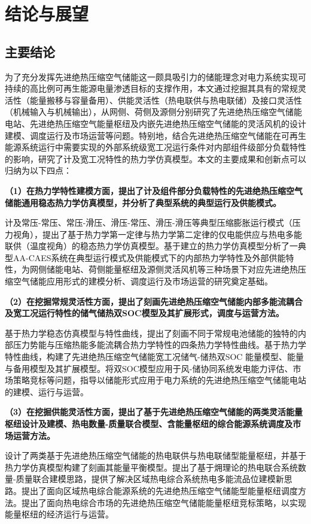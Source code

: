 \chapter{结论与展望}
\label{cha:conclusion}

\section{主要结论}
\label{sec:conclusion}
为了充分发挥先进绝热压缩空气储能这一颇具吸引力的储能理念对电力系统实现可持续的高比例可再生能源电量渗透目标的支撑作用，本文通过挖掘其具有的常规灵活性（能量搬移与容量备用）、供能灵活性（热电联供与热电联储）及接口灵活性（机械输入与机械输出），从网侧、荷侧及源侧分别研究了先进绝热压缩空气储能电站、先进绝热压缩空气能量枢纽及内嵌先进绝热压缩空气储能的灵活风机的设计建模、调度运行及市场运营等问题。特别地，结合先进绝热压缩空气储能在可再生能源系统运行中需要实现的外部系统级宽工况运行条件对内部组件级部分负载特性的影响，研究了计及宽工况特性的热力学仿真模型。本文的主要成果和创新点可以归纳为以下四点：

\textbf{（1）在热力学特性建模方面，提出了计及组件部分负载特性的先进绝热压缩空气储能通用稳态热力学仿真模型，并分析了典型系统的典型运行及供能模式。}

计及常压-常压、常压-滑压、滑压-常压、滑压-滑压等典型压缩膨胀运行模式（压力视角），提出了基于热力学第一定律与热力学第二定律的仅电能供应与热电多能联供（温度视角）的稳态热力学仿真模型。基于建立的热力学仿真模型分析了一典型AA-CAES系统在典型运行模式及供能模式下的内部热力学特性及外部供能特性，为网侧储能电站、荷侧能量枢纽及源侧灵活风机等三种场景下对应先进绝热压缩空气储能应用形式的建模分析、调度运行及市场运营的研究奠定基础。

\textbf{（2）在挖掘常规灵活性方面，提出了刻画先进绝热压缩空气储能内部多能流耦合及宽工况运行特性的储气储热双SOC模型及其扩展形式，调度与运营方法。}

基于热力学稳态仿真模型与特性曲线，提出了刻画不同于常规电池储能的独特的内部压力势能与压缩热能多能流耦合热力学特性的四条热力学特性曲线。基于热力学特性曲线，构建了先进绝热压缩空气储能宽工况储气-储热双SOC 能量模型、能量与备用模型及其扩展模型。将双SOC模型应用于风-储协同系统发电能力评估、市场策略竞标等问题，指导以储能形式应用于电力系统的先进绝热压缩空气储能电站的建模、运行与运营。

\textbf{（3）在挖掘供能灵活性方面，提出了基于先进绝热压缩空气储能的两类灵活能量枢纽设计及建模、热电数量-质量联合模型、含能量枢纽的综合能源系统调度及市场运营方法。}

设计了两类基于先进绝热压缩空气储能的热电联供与热电联储型能量枢纽，并基于热力学仿真模型构建了刻画其能量平衡模型。提出了基于㶲理论的热电联合系统数量-质量联合建模思路，提供了解决区域热电综合系统热电多能流品位建模新思路。提出了面向区域热电综合能源系统的先进绝热压缩空气储能型能量枢纽调度方法。提出了面向热电综合市场的先进绝热压缩空气储能能量枢纽竞标策略，以实现能量枢纽的经济运行与运营。

